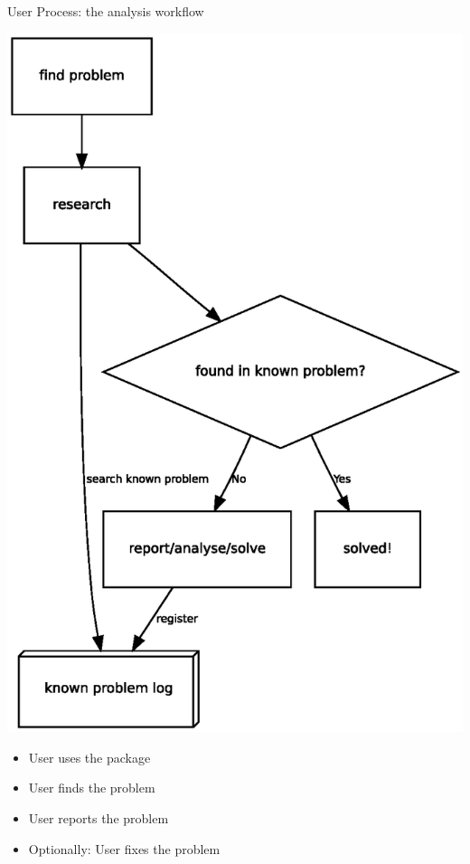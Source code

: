 \documentclass[cjk,dvipdfmx,12pt]{beamer}
\begin{document}
\begin{frame}{User Process: the analysis workflow}
\begin{minipage}{0.40\hsize}
 \includegraphics[width=1\hsize]{image200805/problemcycle-en.eps}
\end{minipage}
\begin{minipage}{0.5\hsize}
 \begin{itemize}
  \item User uses the package
  \item User finds the problem
  \item User reports the problem
  \item Optionally: User fixes the problem
 \end{itemize}
\end{minipage}
\end{frame}
\end{document}
